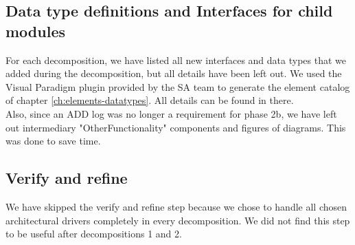 \documentclass[english]{sareport}
\begin{document}
        \subsection{Data type definitions and Interfaces for child modules}
            For each decomposition, we have listed all new interfaces and data types
            that we added during the decomposition, but all details have been left out.
            We used the Visual Paradigm plugin provided by the SA team to generate
            the element catalog of chapter \ref{ch:elements-datatypes}. All details
            can be found in there. \\

            Also, since an ADD log was no longer a requirement for phase 2b, we
            have left out intermediary "OtherFunctionality" components and
            figures of diagrams. This was done to save time.

        \subsection{Verify and refine}
            We have skipped the verify and refine step because we chose to
            handle all chosen architectural drivers completely in every decomposition.
            We did not find this step to be useful after decompositions 1 and 2.

    \newpage
    
    \newpage
    
    \newpage
    
    \newpage
    
    \newpage
    
    \newpage
    
    \newpage
    
    \newpage
    
    \newpage
    
\end{document}
